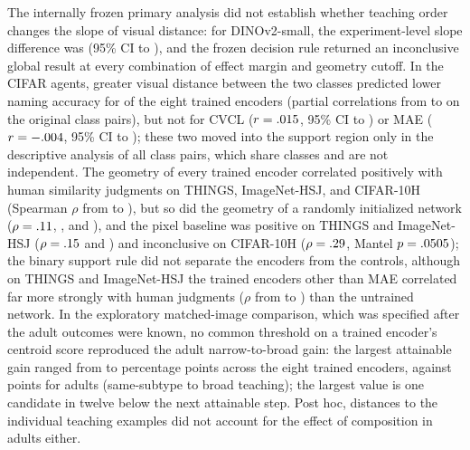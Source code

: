 \documentclass[11pt]{article}
\begin{document}
The internally frozen primary analysis did not establish whether teaching order changes the slope of visual distance: for DINOv2-small, the experiment-level slope difference was \VtOrdDelta{} (95\% CI \VtOrdLo{} to \VtOrdHi), and the frozen decision rule returned an inconclusive global result at every combination of effect margin and geometry cutoff. In the CIFAR agents, greater visual distance between the two classes predicted lower naming accuracy for \VtDSupportWord{} of the eight trained encoders (partial correlations from \VtDrMin{} to \VtDrMax{} on the \VtDN{} original class pairs), but not for CVCL ($r = .015$, 95\% CI \VtDCvclLo{} to \VtDCvclHi) or MAE ($r = -.004$, 95\% CI \VtDMaeLo{} to \VtDMaeHi); these two moved into the support region only in the descriptive analysis of all \VtDallN{} class pairs, which share classes and are not independent. The geometry of every trained encoder correlated positively with human similarity judgments on THINGS, ImageNet-HSJ, and CIFAR-10H (Spearman $\rho$ from \VtHoneMin{} to \VtHoneMax), but so did the geometry of a randomly initialized network ($\rho = .11$, \VtHoneRandHsj, and \VtHoneRandCten), and the pixel baseline was positive on THINGS and ImageNet-HSJ ($\rho = .15$ and \VtHonePixHsj) and inconclusive on CIFAR-10H ($\rho = .29$, Mantel $p = .0505$); the binary support rule did not separate the encoders from the controls, although on THINGS and ImageNet-HSJ the trained encoders other than MAE correlated far more strongly with human judgments ($\rho$ from \VcHoneTrMin{} to \VcHoneTrMax) than the untrained network. In the exploratory matched-image comparison, which was specified after the adult outcomes were known, no common threshold on a trained encoder's centroid score reproduced the adult narrow-to-broad gain: the largest attainable gain ranged from \VtXJumpMin{} to \VtXJumpMax{} percentage points across the eight trained encoders, against \VtXJumpAdult{} points for adults (same-subtype to broad teaching); the largest value is one candidate in twelve below the next attainable step. Post hoc, distances to the individual teaching examples did not account for the effect of composition in adults either.
\end{document}

